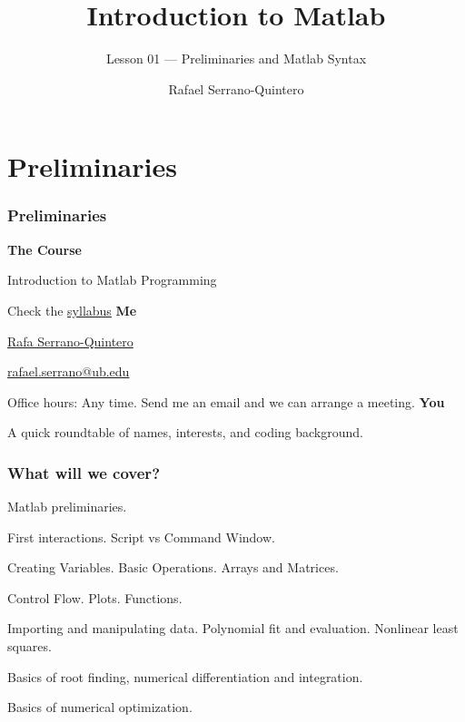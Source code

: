 \documentclass[11pt,xcolor={svgnames},aspectratio=169,usepdftitle=false]{beamer}
\title{Introduction to Matlab}
\subtitle{Lesson 01 --- Preliminaries and Matlab Syntax}
\author{Rafael Serrano-Quintero}
\institute{Department of Economics \\ University of Barcelona}
\date{}
\let\toneitemize\itemize
\let\ttwoitemize\enditemize
\renewenvironment{itemize}{\toneitemize\addtolength{\itemsep}{1.35\baselineskip}}{\ttwoitemize}
\let\toneenumer\enumerate
\let\ttwoenumer\endenumerate
\renewenvironment{enumerate}{\toneenumer\addtolength{\itemsep}{1.35\baselineskip}}{\ttwoenumer}
\begin{document}
\VerbatimFootnotes

\maketitle

\section{Preliminaries}

\begin{frame}
    \frametitle{Preliminaries}
    \textbf{\alert{The Course}}
    \begin{itemize}
        \item Introduction to Matlab Programming
        \item Check the \href{run:../syllabus/syllabus.pdf}{syllabus}
    \end{itemize}
    \textbf{\alert{Me}}
    \begin{itemize}
        \item \href{rafserqui.github.io}{Rafa Serrano-Quintero} 
        \item \href{mailto:rafael.serrano@ub.edu}{rafael.serrano@ub.edu}
        \item Office hours: Any time. Send me an email and we can arrange a meeting.
    \end{itemize}
    \textbf{\alert{You}}
    \begin{itemize}
        \item A quick roundtable of names, interests, and coding background.
    \end{itemize}
\end{frame}

\begin{frame}
    \frametitle{What will we cover?}
    \begin{enumerate}
        \item Matlab preliminaries. 
            \begin{itemize}
                \item First interactions. Script vs Command Window.
                \item Creating Variables. Basic Operations. Arrays and Matrices.
                \item Control Flow. Plots. Functions.
            \end{itemize}
        \item Importing and manipulating data. Polynomial fit and evaluation. Nonlinear least squares.
        \item Basics of root finding, numerical differentiation and integration.
        \item Basics of numerical optimization.
    \end{enumerate}
\end{frame}
\end{document}

